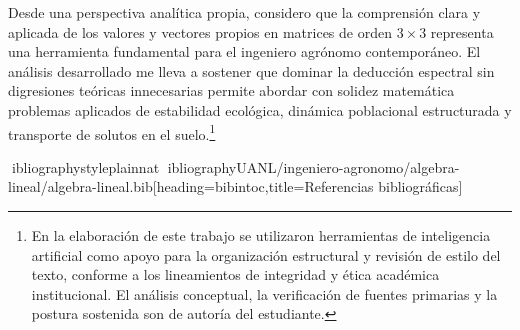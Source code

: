 \documentclass[spanish,letterpaper,oneside]{article}
\begin{document}
Desde una perspectiva analítica propia, considero que la comprensión clara y aplicada de los valores y vectores propios en matrices de orden $3 \times 3$ representa una herramienta fundamental para el ingeniero agrónomo contemporáneo. El análisis desarrollado me lleva a sostener que dominar la deducción espectral sin digresiones teóricas innecesarias permite abordar con solidez matemática problemas aplicados de estabilidad ecológica, dinámica poblacional estructurada y transporte de solutos en el suelo.\footnote{En la elaboración de este trabajo se utilizaron herramientas de inteligencia artificial como apoyo para la organización estructural y revisión de estilo del texto, conforme a los lineamientos de integridad y ética académica institucional. El análisis conceptual, la verificación de fuentes primarias y la postura sostenida son de autoría del estudiante.}

\clearpage
ibliographystyle{plainnat}
ibliography{UANL/ingeniero-agronomo/algebra-lineal/algebra-lineal.bib}[heading=bibintoc,title={Referencias bibliográficas}]
\end{document}

